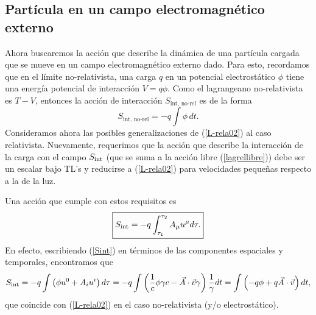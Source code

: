 \subsection{Partícula en un campo electromagnético externo}

Ahora buscaremos la acción que describe la dinámica de una partícula cargada
que se mueve en un campo electromagnético externo dado. Para esto, recordamos
que en el límite no-relativista, una carga $q$ en un potencial electrostático
$\phi$ tiene una energía potencial de interacción $V=q\phi$. Como el
lagrangeano no-relativista es $T-V$, entonces la acción de interacción $S_\text{int, no-rel}$ es de la forma
\begin{equation}
S_\text{int, no-rel}= -q\int \phi\, dt. \label{L-rela02}
\end{equation}
Consideramos ahora las posibles generalizaciones de (\ref{L-rela02}) al caso
relativista. Nuevamente, requerimos que la acción que describe la interacción
de la carga con el campo $S_{\rm int}$ (que se suma a la acción libre
(\ref{lagrellibre})) debe ser un escalar bajo TL's y reducirse a
(\ref{L-rela02}) para velocidades pequeñas respecto a la de la luz.

Una acción que cumple con estos requisitos es
\begin{equation}
\boxed{S_{\rm int}=-q\int_{\tau_1}^{\tau_2}A_\mu u^\mu d\tau.}
\label{Sint}
\end{equation}
En efecto, escribiendo (\ref{Sint}) en términos de las componentes espaciales y
temporales, encontramos que
\begin{equation}
S_{\rm int}=-q\int\left(  \phi u^0+A_i u^i\right)
d\tau=-q\int \left(\frac{1}{c}\phi \gamma c-\vec{A}\cdot\vec{v}\gamma \right)
\frac{1}{\gamma}dt =\int \left(-q\phi+q\vec{A}\cdot\vec{v}\right) dt ,
\label{L-rela03b}
\end{equation}
que coincide con (\ref{L-rela02}) en el caso no-relativista (y/o
electrostático).

